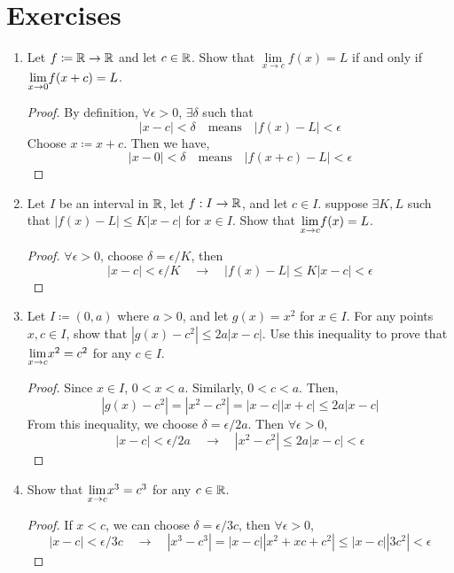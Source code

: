 \section{Exercises}
\begin{enumerate}
    \item Let $f \coloneqq {\mathbb{R}} \rightarrow {\mathbb{R}}$ and let $c \in {\mathbb{R}}$. Show that $\underset{x \to c}{\lim} f(x) = L$ if and only if $\underset{x \to 0}{\lim}f(x+c) = L$.
        \begin{proof}
            By definition, $\forall \epsilon > 0$, $\exists \delta$ such that
            \[|x-c| < \delta \quad \text{means} \quad |f(x) -L| < \epsilon\]
            Choose $x \coloneqq x+c$. Then we have,
            \[ |x-0| < \delta \quad \text{means} \quad |f(x+c) - L| < \epsilon\]
        \end{proof}
    \item Let $I$ be an interval in ${\mathbb{R}}$, let $f : I \to {\mathbb{R}}$, and let $c \in I$. suppose $\exists K,L$ such that $|f(x) - L| \le K|x-c|$ for $x \in I$. Show that $\underset{x \to c}{\lim}f(x) = L$.
        \begin{proof}
            $\forall \epsilon >0$, choose $\delta = \epsilon/K$, then
            \[ |x - c| < \epsilon/K \quad \rightarrow \quad |f(x)-L| \le K|x-c| < \epsilon\]
        \end{proof}
    \item Let $I \coloneqq (0,a)$ where $a > 0$, and let $g(x) = x^2$ for $x \in I$. For any points $x,c \in I$, show that $|g(x)-c^2| \le 2a|x-c|$. Use this inequality to prove that $\underset{x \to c}{\lim}x^2 = c^2$ for any $c \in I$.
    \begin{proof}
        Since $x \in I$, $0 < x < a$. Similarly, $ 0 < c < a$. Then,
        \[ |g(x) -c^2| = |x^2-c^2| = |x-c||x+c| \le 2a|x-c|\]
        From this inequality, we choose $\delta = \epsilon/2a$. Then $\forall \epsilon > 0$,
        \[ |x-c| < \epsilon/2a \quad \rightarrow \quad |x^2-c^2|\le 2a|x-c| < \epsilon\]
    \end{proof}
\item Show that $\underset{x \to c}{\lim}x^3 = c^3$ for any $c \in {\mathbb{R}}$.
    \begin{proof}
        If $x < c$, we can choose $\delta = \epsilon/ 3c$, then $\forall \epsilon > 0$,
        \[ |x-c| < \epsilon/ 3c \quad \rightarrow \quad |x^3-c^3| = |x-c||x^2+xc+c^2| \le |x-c||3c^2| < \epsilon\]
    \end{proof}
\end{enumerate}

